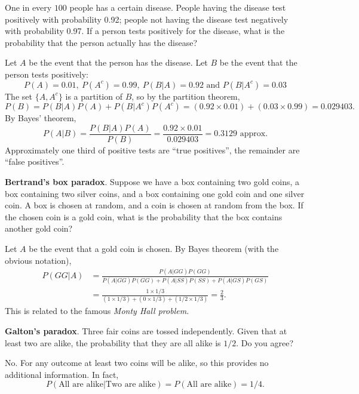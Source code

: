 \begin{example}
One in every $100$ people has a certain disease. People having the disease test positively with probability 0.92; people not having the disease test negatively with probability 0.97. If a person tests positively for the disease, what is the probability that the person actually has the disease? 
\begin{solution}
Let $A$ be the event that the person has the disease. Let $B$ be the event that
the person tests positively: 
\[
P(A)=0.01,\ P(A^c)=0.99,\ P(B|A)=0.92 \text{ and } P(B|A^c)=0.03
\]
The set $\{A,A^c\}$ is a partition of $B$, so by the partition theorem,
\[
P(B) 
	= P(B|A)P(A)+P(B|A^c)P(A^c) 
	= (0.92\times 0.01)+(0.03\times 0.99)
	= 0.029403.
\]
By Bayes' theorem,
\[
P(A|B)	
	= \frac{P(B|A)P(A)}{P(B)}
	= \frac{0.92\times 0.01}{0.029403}
	= 0.3129 \text{ approx.}
\]
Approximately one third of positive tests are ``true positives'', the remainder are ``false positives''.
\end{solution}
\end{example}

\begin{exercise}
\begin{questions}
\question %
\textbf{Bertrand's box paradox}. Suppose we have a box containing two gold coins, a box containing two silver coins, and a box containing one gold coin and one silver coin. A box is chosen at random, and a coin is chosen at random from the box. If the chosen coin is a gold coin, what is the probability that the box contains another gold coin?
\begin{answer}
Let $A$ be the event that a gold coin is chosen. By Bayes theorem (with the obvious notation),
\begin{align*}
P(GG|A) 
	& = \frac{P(A|GG)P(GG)}{P(A|GG)P(GG)+P(A|SS)P(SS)+P(A|GS)P(GS)} \\
	& = \frac{1\times 1/3}{(1\times 1/3)+(0\times 1/3)+(1/2\times 1/3)}
	= \frac{2}{3}.
\end{align*}
This is related to the famous \emph{Monty Hall problem}. 
\end{answer}
\question %
\textbf{Galton's paradox}. Three fair coins are tossed independently. Given that at least two are alike, the probability that they are all alike is $1/2$. Do you agree?
\begin{answer}
No. For any outcome at least two coins will be alike, so this provides no additional information. In fact,
\[
P(\text{All are alike} | \text{Two are alike}) = P(\text{All are alike}) = 1/4.
\]
\end{answer}
\end{questions}
\end{exercise}


